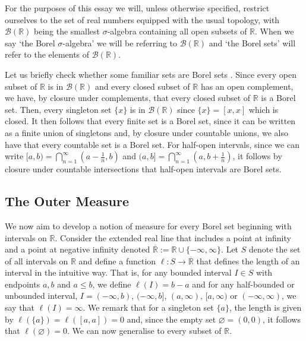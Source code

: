 \documentclass[a4paper,11pt]{article}
\theoremstyle{plain}
\theoremstyle{definition}
\newtheorem{definition}[theorem]{Definition}
\newtheorem{remark}[theorem]{Remark}
\begin{document}
For the purposes of this essay we will, unless otherwise specified, restrict ourselves to the set of real numbers equipped with the usual topology, with $\mathcal{B}(\mathbb{R})$ being the smallest $\sigma$-algebra containing all open subsets of $\mathbb{R}$. When we say `the Borel $\sigma$-algebra' we will be referring to $\mathcal{B}(\mathbb{R})$ and `the Borel sets' will refer to the elements of $\mathcal{B}(\mathbb{R})$.


Let us briefly check whether some familiar sets are Borel sets \citep[pp.~40--42]{MC}. Since every open subset of $\mathbb{R}$ is in $\mathcal{B}(\mathbb{R})$ and every closed subset of $\mathbb{R}$ has an open complement, we have, by closure under complements, that every closed subset of $\mathbb{R}$ is a Borel set. Then, every singleton set $\{x\}$ is in $\mathcal{B}(\mathbb{R})$ since $\{x\} = [x,x]$ which is closed. It then follows that every finite set is a Borel set, since it can be written as a finite union of singletons and, by closure under countable unions, we also have that every countable set is a Borel set. For half-open intervals, since we can write $[a,b) = \bigcap_{n=1}^{\infty} (a - \frac{1}{n}, b)$ and $(a,b] = \bigcap_{n=1}^{\infty} (a, b + \frac{1}{n})$, it follows by closure under countable intersections that half-open intervals are Borel sets.

\subsection{The Outer Measure}
We now aim to develop a notion of measure for every Borel set beginning with intervals on $\mathbb{R}$. Consider the extended real line that includes a point at infinity and a point at negative infinity denoted $\overline{\mathbb{R}} := \mathbb{R} \cup \{-\infty,\infty\}$. Let $S$ denote the set of all intervals on $\mathbb{R}$ and define a function $\ell : S \rightarrow \overline{\mathbb{R}}$ that defines the length of an interval in the intuitive way. That is, for any bounded interval $I \in S$ with endpoints $a,b$ and $a \leq b$, we define $\ell(I) = b - a$ and for any half-bounded or unbounded interval, $I = (-\infty,b)$, $(-\infty,b]$, $(a,\infty)$, $[a,\infty)$ or $(-\infty,\infty)$, we say that $\ell(I) = \infty$. We remark that for a singleton set $\{a\}$, the length is given by $\ell(\{a\}) = \ell([a,a]) = 0$ and, since the empty set $\varnothing = (0,0)$, it follows that $\ell(\varnothing) = 0$. We can now generalise to every subset of $\mathbb{R}$.
\end{document}
